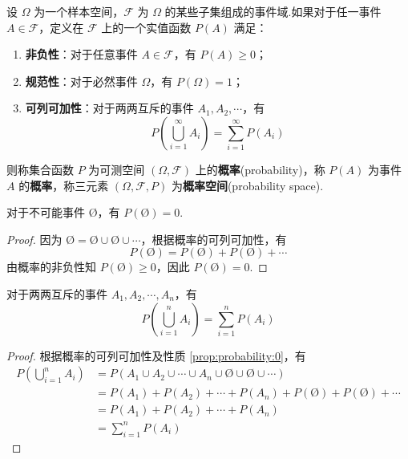\begin{definition}
    \indent 设 $\varOmega$ 为一个样本空间，$\mathcal{F}$ 为 $\varOmega$ 的某些子集组成的事件域.如果对于任一事件 $A \in \mathcal{F}$，定义在 $\mathcal{F}$ 上的一个实值函数 $P(A)$ 满足：
    \begin{enumerate}
        \item \textbf{非负性}：对于任意事件 $A \in \mathcal{F}$，有 $P(A) \geqslant 0$；
        \item \textbf{规范性}：对于必然事件 $\varOmega$，有 $P(\varOmega)=1$；
        \item \textbf{可列可加性}：对于两两互斥的事件 $A_1,A_2,\cdots$，有
        $$
        P \left(\bigcup_{i=1}^\infty A_i \right) = \sum_{i=1}^\infty P(A_i)
        $$
    \end{enumerate}
    则称集合函数 $P$ 为可测空间 $(\varOmega, \mathcal{F})$ 上的\textbf{概率}(probability)，称 $P(A)$ 为事件 $A$ 的\textbf{概率}，称三元素 $(\varOmega, \mathcal{F}, P)$ 为\textbf{概率空间}(probability space).
\end{definition}

\begin{property}
    \indent 对于不可能事件 $\text{\O}$，有 $P(\text{\O})=0$.
\end{property}

\begin{proof}
    因为 $\text{\O} = \text{\O} \cup \text{\O} \cup \cdots$，根据概率的可列可加性，有
    $$
    P(\text{\O}) = P(\text{\O}) + P(\text{\O}) + \cdots
    $$
    由概率的非负性知 $P(\text{\O}) \geqslant 0$，因此 $P(\text{\O})=0$.
\end{proof}

\begin{property}
    \indent 对于两两互斥的事件 $A_1,A_2,\cdots,A_n$，有
    \begin{equation}
        P \left(\bigcup_{i=1}^n A_i \right) = \sum_{i=1}^n P(A_i)
    \end{equation}
\end{property}

\begin{proof}
    根据概率的可列可加性及性质 \ref{prop:probability:0}，有
    $$
    \begin{aligned}
        P \left(\bigcup_{i=1}^n A_i \right) &= P(A_1 \cup A_2 \cup \cdots \cup A_n \cup \text{\O} \cup \text{\O} \cup \cdots) \\
        &= P(A_1) + P(A_2) + \cdots + P(A_n) + P(\text{\O}) + P(\text{\O}) + \cdots \\
        &= P(A_1) + P(A_2) + \cdots + P(A_n) \\
        &= \sum_{i=1}^n P(A_i)
    \end{aligned}
    $$
\end{proof}

